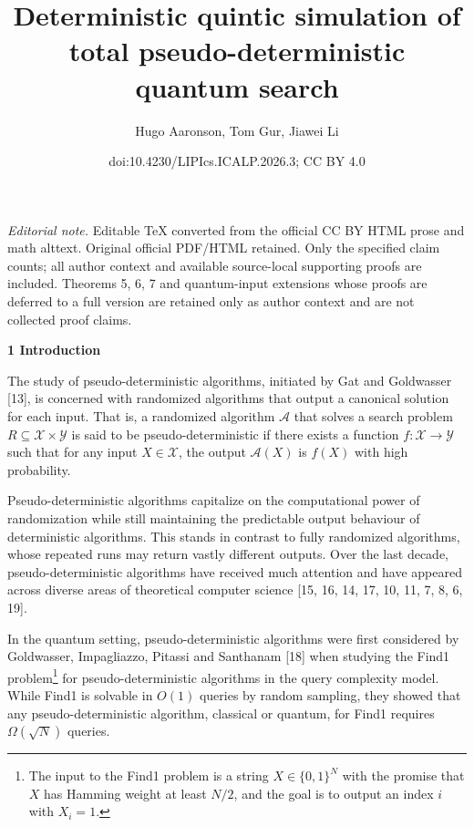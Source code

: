 \documentclass[10pt,a4paper]{article}
\title{Deterministic quintic simulation of total pseudo-deterministic quantum search}
\author{Hugo Aaronson, Tom Gur, Jiawei Li}
\date{doi:10.4230/LIPIcs.ICALP.2026.3; CC BY 4.0}
\begin{document}
\maketitle
\noindent\textit{Editorial note.} Editable TeX converted from the official CC BY HTML prose and math alttext. Original official PDF/HTML retained. Only the specified claim counts; all author context and available source-local supporting proofs are included. Theorems 5, 6, 7 and quantum-input extensions whose proofs are deferred to a full version are retained only as author context and are not collected proof claims.\par\medskip


\par\medskip\noindent\textbf{
1 Introduction}\par




The study of pseudo-deterministic algorithms, initiated by Gat and Goldwasser [13], is concerned with randomized algorithms that output a canonical solution for each input. That is, a randomized algorithm $\mathcal{A}$ that solves a search problem ${R}\subseteq\mathcal{X}\times\mathcal{Y}$ is said to be pseudo-deterministic if there exists a function $f:\mathcal{X}\rightarrow\mathcal{Y}$ such that for any input $X\in\mathcal{X}$, the output $\mathcal{A}(X)$ is $f(X)$ with high probability.\par




Pseudo-deterministic algorithms capitalize on the computational power of randomization while still maintaining the predictable output behaviour of deterministic algorithms. This stands in contrast to fully randomized algorithms, whose repeated runs may return vastly different outputs.
Over the last decade, pseudo-deterministic algorithms have received much attention and have appeared across diverse areas of theoretical computer science [15, 16, 14, 17, 10, 11, 7, 8, 6, 19].\par




In the quantum setting, pseudo-deterministic algorithms were first considered by Goldwasser, Impagliazzo, Pitassi and Santhanam [18] when studying the Find1 problem\footnote{The input to the Find1 problem is a string $X\in\{0,1\}^{N}$ with the promise that $X$ has Hamming weight at least $N/2$, and the goal is to output an index $i$ with $X_{i}=1$.}
for pseudo-deterministic algorithms in the query complexity model. While Find1 is solvable in $O(1)$ queries by random sampling, they showed that any pseudo-deterministic algorithm, classical or quantum, for Find1 requires ${\Omega}(\sqrt{N})$ queries.\par
\end{document}
